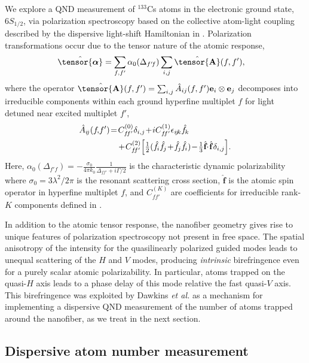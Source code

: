 \documentclass[aps,pra,twocolumn]{revtex4-1} %
\newcommand{\poltens}{\hat{\tensor{\boldsymbol{\alpha}}}}
\newcommand{\charpol}{\alpha_0(\Delta_{f'\!f})}
\begin{document}
We explore a QND measurement of ${}^{133}$Cs atoms in the electronic ground state, $6S_{1/2}$, via polarization spectroscopy based on the collective atom-light coupling described by the dispersive light-shift Hamiltonian in . Polarization transformations occur due to the tensor nature of the atomic response,
	\begin{align} \label{Eq::Polarizability}
		\poltens &=  \sum_{f,f'} \charpol \sum_{i,j} \hat{\tensor{\mbf{A}}}(f,f'),
	\end{align}
where the operator $\hat{\tensor{\mbf{A}}}(f,f') = \sum_{i,j} \hat{A}_{ij}(f,f')\mathbf{e}_i \otimes \mathbf{e}_j$ decomposes into irreducible components within each ground hyperfine multiplet $f$ for light detuned near excited multiplet $f'$,  
	\begin{align} \label{Eq::PolarizabilityIrrep}
		\hat{A}_{i\!j}(f\!,\!f')&\!=\!  C_{f\!f'}^{(0)} \delta_{i,j}\!+\! iC_{f\!f'}^{(1)}\epsilon_{i\!j\!k}\hat{f}\!_k \nn\\
		&\quad\!+\! C_{f\!f'}^{(2)} \Big[ \smallfrac{1}{2} ( \hat{f}\!_i\hat{f}\!_j \!+\!\hat{f}\!_j\hat{f}\!_i )\!-\!\smallfrac{1}{3} \hat{\mathbf{f}}\!\!\cdot\!\hat{\mathbf{f}} \delta_{i,j} \Big]. 
\end{align}
Here, $\charpol = -\frac{\sigma_0}{4\pi k_0}\frac{1 }{\Delta_{ff'}+i\Gamma/2}$ is the characteristic dynamic polarizability where $\sigma_0 = 3 \lambda^2/2\pi$ is the resonant scattering cross section, $\hat{\mathbf{f}}$ is the atomic  spin operator in hyperfine multiplet $f$, and $C_{ff'}^{(K)}$ are coefficients for irreducible rank-$K$ components defined in \cite{deutsch_quantum_2010}. 

In addition to the atomic tensor response, the nanofiber geometry gives rise to unique features of polarization spectroscopy not present in free space.  The spatial anisotropy of the intensity for the quasilinearly polarized guided modes leads to unequal scattering of the $H$ and $V$ modes, producing \emph{intrinsic} birefringence even for a purely scalar atomic polarizability.  
In particular, atoms trapped on the quasi-$H$ axis leads to a phase delay of this mode relative the fast quasi-$V$ axis. 
This birefringence was exploited by Dawkins {\em et al.} \cite{dawkins_dispersive_2011} as a mechanism for implementing a dispersive QND measurement of the number of atoms trapped around the nanofiber, as we treat in the next section. 


	\subsection{Dispersive atom number measurement} \label{Sec::AtomNumberMeasurement}
\end{document}
